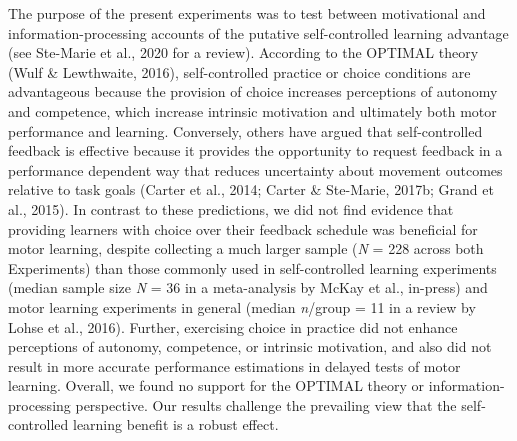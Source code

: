 \documentclass[
  doc, donotrepeattitle,floatsintext]{apa7}
\begin{document}
The purpose of the present experiments was to test between motivational and information-processing accounts of the putative self-controlled learning advantage (see Ste-Marie et al., 2020 for a review). According to the OPTIMAL theory (Wulf \& Lewthwaite, 2016), self-controlled practice or choice conditions are advantageous because the provision of choice increases perceptions of autonomy and competence, which increase intrinsic motivation and ultimately both motor performance and learning. Conversely, others have argued that self-controlled feedback is effective because it provides the opportunity to request feedback in a performance dependent way that reduces uncertainty about movement outcomes relative to task goals (Carter et al., 2014; Carter \& Ste-Marie, 2017b; Grand et al., 2015). In contrast to these predictions, we did not find evidence that providing learners with choice over their feedback schedule was beneficial for motor learning, despite collecting a much larger sample (\emph{N} = 228 across both Experiments) than those commonly used in self-controlled learning experiments (median sample size \emph{N} = 36 in a meta-analysis by McKay et al., in-press) and motor learning experiments in general (median \emph{n}/group = 11 in a review by Lohse et al., 2016). Further, exercising choice in practice did not enhance perceptions of autonomy, competence, or intrinsic motivation, and also did not result in more accurate performance estimations in delayed tests of motor learning. Overall, we found no support for the OPTIMAL theory or information-processing perspective. Our results challenge the prevailing view that the self-controlled learning benefit is a robust effect.
\end{document}
